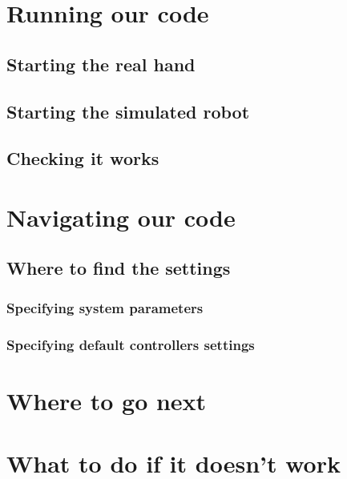 \documentclass[12pt]{article}
\begin{document}
\newpage

\section{Running our code}
\label{sec:running-our-code}

\subsection{Starting the real hand}
\label{sec:starting-real-hand}

\subsection{Starting the simulated robot}
\label{sec:start-simul-hand}

\subsection{Checking it works}
\label{sec:checking-it-works}

\newpage

\section{Navigating our code}
\label{sec:navigate}

\subsection{Where to find the settings}
\label{sec:where-find-settings}

\subsubsection{Specifying system parameters}
\label{sec:spec-system-param}

\subsubsection{Specifying default controllers settings}
\label{sec:spec-defa-contr}

\newpage

\section{Where to go next}
\label{sec:where_to_go}

\newpage

\section{What to do if it doesn't work}
\label{sec:what-do-if}
\end{document}
